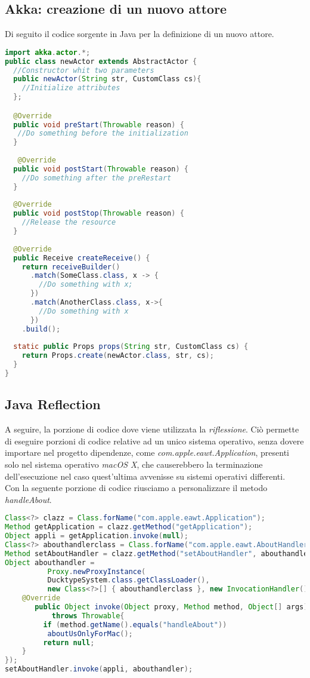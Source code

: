 \subsection{Akka: creazione di un nuovo attore}
\label{sec:akkanew}
Di seguito il codice sorgente in Java per la definizione di un nuovo attore.
\begin{lstlisting}[language=java]
import akka.actor.*;
public class newActor extends AbstractActor {
  //Constructor whit two parameters
  public newActor(String str, CustomClass cs){
    //Initialize attributes
  };

  @Override
  public void preStart(Throwable reason) {
   //Do something before the initialization
  }
  
   @Override
  public void postStart(Throwable reason) {
    //Do something after the preRestart
  }
  
  @Override
  public void postStop(Throwable reason) {
    //Release the resource
  }
  
  @Override
  public Receive createReceive() {
    return receiveBuilder()
      .match(SomeClass.class, x -> {
        //Do something with x;
      })
      .match(AnotherClass.class, x->{
        //Do something with x
      })
    .build();
  
  static public Props props(String str, CustomClass cs) {
    return Props.create(newActor.class, str, cs);
  }
}
\end{lstlisting}

\newpage
\subsection{Java Reflection}
\label{sec:javaReflection}
A seguire, la porzione di codice dove viene utilizzata la \emph{riflessione}. Ciò permette di eseguire
porzioni di codice relative ad un unico sistema operativo, senza dovere importare nel progetto
dipendenze, come \emph{com.apple.eawt.Application}, presenti solo nel sistema operativo \emph{macOS X}, che
causerebbero la terminazione dell'esecuzione nel caso quest'ultima avvenisse su sistemi operativi differenti.\\

Con la seguente porzione di codice riusciamo a personalizzare il metodo \emph{handleAbout}.
\begin{lstlisting}[language=java]
Class<?> clazz = Class.forName("com.apple.eawt.Application");
Method getApplication = clazz.getMethod("getApplication");
Object appli = getApplication.invoke(null);
Class<?> abouthandlerclass = Class.forName("com.apple.eawt.AboutHandler");
Method setAboutHandler = clazz.getMethod("setAboutHandler", abouthandlerclass);
Object abouthandler = 
          Proxy.newProxyInstance(
          DucktypeSystem.class.getClassLoader(),
          new Class<?>[] { abouthandlerclass }, new InvocationHandler(){
    @Override
       public Object invoke(Object proxy, Method method, Object[] args)
           throws Throwable{
         if (method.getName().equals("handleAbout"))
          aboutUsOnlyForMac();
         return null;
    }
});
setAboutHandler.invoke(appli, abouthandler);
\end{lstlisting}



